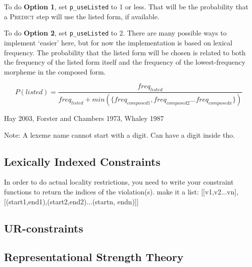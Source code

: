 \documentclass[12]{article}
\begin{document}
		To do {\bf Option 1}, set \texttt{p\_useListed} to 1 or less.  That will be the probability that a \textsc{Predict} step will use the listed form, if available.
		
		To do {\bf Option 2}, set \texttt{p\_useListed} to 2. There are many possible ways to implement `easier' here, but for now the implementation is based on lexical frequency.  The probability that the listed form will be chosen is related to both the frequency of the listed form itself and the frequency of the lowest-frequency morpheme in the composed form.  
		
		\[
		P(listed) = \frac{freq_{listed}}{freq_{listed} + min(\{freq_{composed1}, freq_{composed2}\ldots freq_{composedx}\})}
		\]
		
		Hay 2003, Forster and Chambers 1973, Whaley 1987 %

		Note: A lexeme name cannot start with a digit.  Can have a digit inside tho.

	\subsection{Lexically Indexed Constraints}
		
		In order to do actual locality restrictions, you need to write your constraint functions to return the indices of the violation(s).  make it a list: [[v1,v2...vn],[(start1,end1),(start2,end2)...(startn, endn)]]
		

		
	\subsection{UR-constraints}

	\subsection{Representational Strength Theory}
\end{document}
